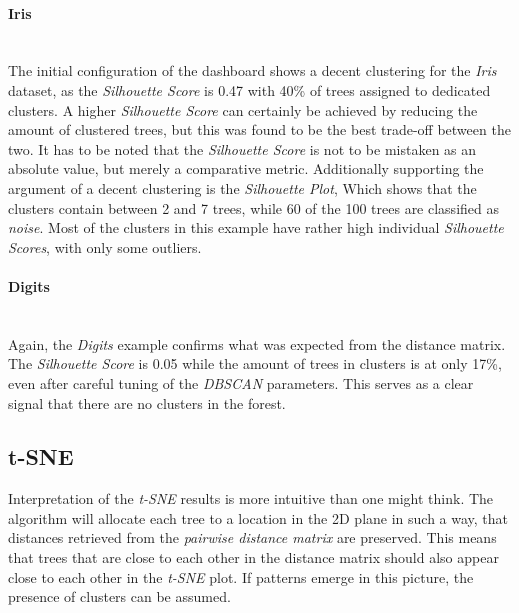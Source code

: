 \documentclass[a4paper, 12pt]{article}
\begin{document}
\paragraph{Iris}\mbox{}\\
The initial configuration of the dashboard shows a decent clustering for the \textit{Iris} dataset, as the
\textit{Silhouette Score} is 0.47
with 40\% of trees assigned to dedicated clusters. A higher \textit{Silhouette Score} can certainly be achieved
by reducing the amount of clustered trees, but this was found to be the best trade-off between the two. It has
to be noted that the \textit{Silhouette Score} is not to be mistaken as an absolute value, but merely a
comparative metric. Additionally supporting the argument of a decent clustering is the \textit{Silhouette Plot},
Which shows that the clusters contain between 2 and 7 trees, while 60 of the 100 trees are classified as
\textit{noise}. Most of the clusters in this example have rather high individual \textit{Silhouette Scores},
with only some outliers. \par

\paragraph{Digits}\mbox{}\\
Again, the \textit{Digits} example confirms what was expected from the distance matrix. The \textit{Silhouette
    Score} is 0.05 while the amount of trees in clusters is at only 17\%, even after careful tuning of the
\textit{DBSCAN} parameters. This serves as a clear signal that there are no clusters in the forest.

\subsection{t-SNE}
Interpretation of the \textit{t-SNE} results is more intuitive than one might think. The algorithm will allocate
each tree to a location in the 2D plane in such a way, that distances retrieved from the \textit{pairwise
    distance matrix} are preserved. This means that trees that are close to each other in the distance matrix should
also appear close to each other in the \textit{t-SNE} plot. If patterns emerge in this picture, the presence of
clusters can be assumed. \par
\end{document}

